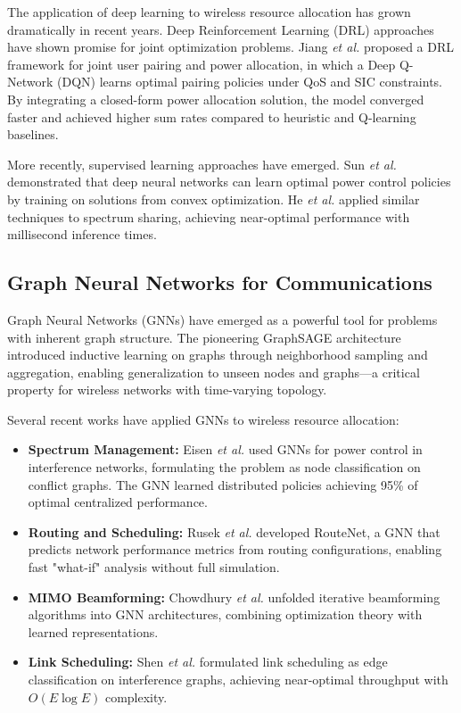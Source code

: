 The application of deep learning to wireless resource allocation has grown dramatically in recent years. Deep Reinforcement Learning (DRL) approaches have shown promise for joint optimization problems. Jiang \textit{et al.} \cite{jiang2021joint} proposed a DRL framework for joint user pairing and power allocation, in which a Deep Q-Network (DQN) learns optimal pairing policies under QoS and SIC constraints. By integrating a closed-form power allocation solution, the model converged faster and achieved higher sum rates compared to heuristic and Q-learning baselines.

More recently, supervised learning approaches have emerged. Sun \textit{et al.} \cite{sun2018learning} demonstrated that deep neural networks can learn optimal power control policies by training on solutions from convex optimization. He \textit{et al.} \cite{he2020learning} applied similar techniques to spectrum sharing, achieving near-optimal performance with millisecond inference times.

\subsection{Graph Neural Networks for Communications}

Graph Neural Networks (GNNs) have emerged as a powerful tool for problems with inherent graph structure. The pioneering GraphSAGE architecture \cite{hamilton2017inductive} introduced inductive learning on graphs through neighborhood sampling and aggregation, enabling generalization to unseen nodes and graphs—a critical property for wireless networks with time-varying topology.

Several recent works have applied GNNs to wireless resource allocation:

\begin{itemize}
    \item \textbf{Spectrum Management:} Eisen \textit{et al.} \cite{eisen2020optimal} used GNNs for power control in interference networks, formulating the problem as node classification on conflict graphs. The GNN learned distributed policies achieving 95\% of optimal centralized performance.
    
    \item \textbf{Routing and Scheduling:} Rusek \textit{et al.} \cite{rusek2020graph} developed RouteNet, a GNN that predicts network performance metrics from routing configurations, enabling fast "what-if" analysis without full simulation.
    
    \item \textbf{MIMO Beamforming:} Chowdhury \textit{et al.} \cite{chowdhury2021unfolding} unfolded iterative beamforming algorithms into GNN architectures, combining optimization theory with learned representations.
    
    \item \textbf{Link Scheduling:} Shen \textit{et al.} \cite{shen2021graph} formulated link scheduling as edge classification on interference graphs, achieving near-optimal throughput with $O(E \log E)$ complexity.
\end{itemize}

